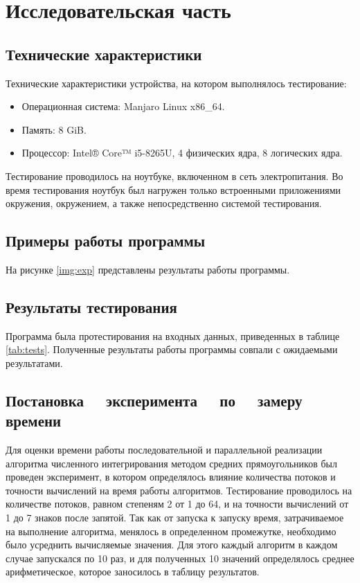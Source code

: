 \chapter{Исследовательская часть}

\section{Технические характеристики}

Технические характеристики устройства, на котором выполнялось тестирование:

\begin{itemize}
	\item Операционная система: Manjaro \cite{manjaro} Linux x86\_64.
	\item Память: 8 GiB.
    \item Процессор: Intel® Core™ i5-8265U, 4 физических ядра, 8 логических
        ядра\cite{intel}.
\end{itemize}

Тестирование проводилось на ноутбуке, включенном в сеть электропитания. Во
время тестирования ноутбук был нагружен только встроенными приложениями
окружения, окружением, а также непосредственно системой тестирования.

\section{Примеры работы программы}

На рисунке \ref{img:exp} представлены результаты работы программы.


\section{Результаты тестирования}

Программа была протестирования на входных данных, приведенных в таблице
\ref{tab:tests}. Полученные результаты работы программы совпали с ожидаемыми
результатами.

\section[Постановка эксперимента по замеру времени]
        {Постановка ~~эксперимента ~~по ~~замеру времени}

Для оценки времени работы последовательной и параллельной реализации алгоритма
численного интегрирования методом средних прямоугольников был проведен
эксперимент, в котором определялось влияние количества потоков и точности
вычислений на время работы алгоритмов. Тестирование проводилось на количестве
потоков, равном степеням 2 от 1 до 64, и на точности вычислений от 1 до 7
знаков после запятой. Так как от запуска к запуску время, затрачиваемое на
выполнение алгоритма, менялось в определенном промежутке, необходимо было
усреднить вычисляемые значения. Для этого каждый алгоритм в каждом случае
запускался по 10 раз, и для полученных 10 значений определялось среднее
арифметическое, которое заносилось в таблицу результатов.

